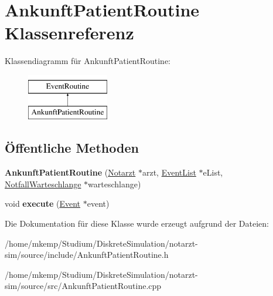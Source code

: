 \hypertarget{classAnkunftPatientRoutine}{}\section{Ankunft\+Patient\+Routine Klassenreferenz}
\label{classAnkunftPatientRoutine}
Klassendiagramm für Ankunft\+Patient\+Routine\+:\begin{figure}[H]
\begin{center}
\leavevmode
\includegraphics[height=2.000000cm]{classAnkunftPatientRoutine}
\end{center}
\end{figure}
\subsection*{Öffentliche Methoden}
\begin{DoxyCompactItemize}
\item 
{\bfseries Ankunft\+Patient\+Routine} (\hyperlink{classNotarzt}{Notarzt} $\ast$arzt, \hyperlink{classEventList}{Event\+List} $\ast$e\+List, \hyperlink{classNotfallWarteschlange}{Notfall\+Warteschlange} $\ast$warteschlange)\hypertarget{classAnkunftPatientRoutine_af9bd136552d3e2acd505620ca5164f58}{}\label{classAnkunftPatientRoutine_af9bd136552d3e2acd505620ca5164f58}

\item 
void {\bfseries execute} (\hyperlink{classEvent}{Event} $\ast$event)\hypertarget{classAnkunftPatientRoutine_a42cdf97821606ce3d4f807b685f3a70d}{}\label{classAnkunftPatientRoutine_a42cdf97821606ce3d4f807b685f3a70d}

\end{DoxyCompactItemize}


Die Dokumentation für diese Klasse wurde erzeugt aufgrund der Dateien\+:\begin{DoxyCompactItemize}
\item 
/home/mkemp/\+Studium/\+Diskrete\+Simulation/notarzt-\/sim/source/include/Ankunft\+Patient\+Routine.\+h\item 
/home/mkemp/\+Studium/\+Diskrete\+Simulation/notarzt-\/sim/source/src/Ankunft\+Patient\+Routine.\+cpp\end{DoxyCompactItemize}
